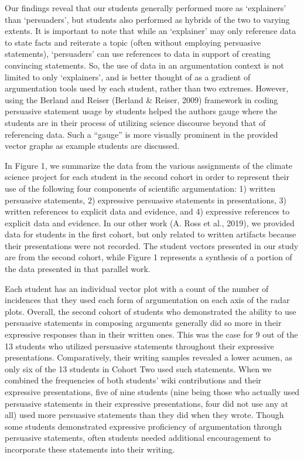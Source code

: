 \documentclass[11.5pt]{sig-alternate} %
\begin{document}
\begin{large}
Our findings reveal that our students generally performed more as ‘explainers’ than ‘persuaders’, but students also performed as hybrids of the two to varying extents. It is important to note that while an ‘explainer’ may only reference data to state facts and reiterate a topic (often without employing persuasive statements), ‘persuaders’ can use references to data in support of creating convincing statements. So, the use of data in an argumentation context is not limited to only ‘explainers’, and is better thought of as a gradient of argumentation tools used by each student, rather than two extremes. However, using the Berland and Reiser (Berland \& Reiser, 2009) framework in coding persuasive statement usage by students helped the authors gauge where the students are in their process of utilizing science discourse beyond that of referencing data. Such a “gauge” is more visually prominent in the provided vector graphs as example students are discussed.

In Figure 1, we summarize the data from the various assignments of the climate science project for each student in the second cohort in order to represent their use of the following four components of scientific argumentation: 1) written persuasive statements, 2) expressive persuasive statements in presentations, 3) written references to explicit data and evidence, and 4) expressive references to explicit data and evidence. In our other work (A. Ross et al., 2019), we provided data for students in the first cohort, but only related to written artifacts because their presentations were not recorded. The student vectors presented in our study are from the second cohort, while Figure 1 represents a synthesis of a portion of the data presented in that parallel work.

Each student has an individual vector plot with a count of the number of incidences that they used each form of argumentation on each axis of the radar plots. Overall, the second cohort of students who demonstrated the ability to use persuasive statements in composing arguments generally did so more in their expressive responses than in their written ones. This was the case for 9 out of the 13 students who utilized persuasive statements throughout their expressive presentations. Comparatively, their writing samples revealed a lower acumen, as only six of the 13 students in Cohort Two used such statements. When we combined the frequencies of both students’ wiki contributions and their expressive presentations, five of nine students (nine being those who actually used persuasive statements in their expressive presentations, four did not use any at all) used more persuasive statements than they did when they wrote. Though some students demonstrated expressive proficiency of argumentation through persuasive statements, often students needed additional encouragement to incorporate these statements into their writing. 


\end{large}
\end{document}
